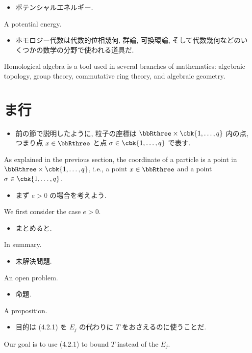 \documentclass[openany, a4paper, oneside]{jsbook}
\begin{document}
\begin{itemize}
\item ポテンシャルエネルギー.
\end{itemize}
A potential energy.

\begin{itemize}
\item ホモロジー代数は代数的位相幾何, 群論, 可換環論, そして代数幾何などのいくつかの数学の分野で使われる道具だ. \cite{CharlesWeibel1}
\end{itemize}
Homological algebra is a tool used in several branches of mathematics: algebraic topology, group theory,
commutative ring theory, and algebraic geometry.
\section{ま行}

\begin{itemize}
\item 前の節で説明したように, 粒子の座標は $\bbRthree \times \cbk{1, \dots, q}$ 内の点,
つまり点 $x \in \bbRthree$ と点 $\sigma \in \cbk{1, \dots, q}$ で表す. \cite{LiebSeiringer1}
\end{itemize}
As explained in the previous section, the coordinate of a particle is a point in $\bbRthree \times \cbk{1, \dots, q}$, i.e.,
a point $x \in \bbRthree$ and a point $\sigma \in \cbk{1, \dots, q}$.

\begin{itemize}
\item まず $e>0$ の場合を考えよう. \cite{LiebSeiringer1}
\end{itemize}
We first consider the case $e > 0$.

\begin{itemize}
\item まとめると.
\end{itemize}
In summary.

\begin{itemize}
\item 未解決問題.
\end{itemize}
An open problem.

\begin{itemize}
\item 命題.
\end{itemize}
A proposition.

\begin{itemize}
\item 目的は (4.2.1) を $E_j$ の代わりに $T$ をおさえるのに使うことだ. \cite{LiebSeiringer1}
\end{itemize}
Our goal is to use (4.2.1) to bound $T$ instead of the $E_j$.
\end{document}
